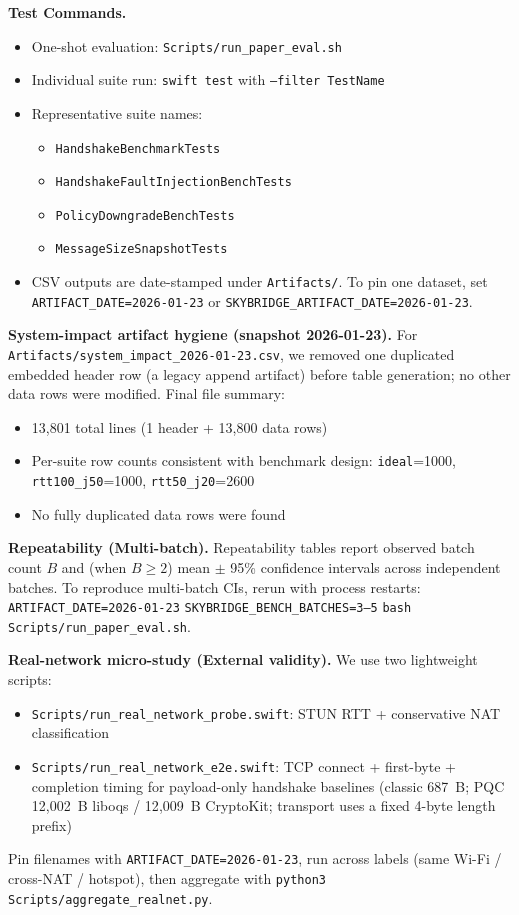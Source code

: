 \documentclass[10pt,journal,compsoc]{IEEEtran}
\providecommand{\tightlist}{%
	  \setlength{\itemsep}{0pt}\setlength{\parskip}{0pt}}
\begin{document}
\textbf{Test Commands.}
\begin{itemize}\tightlist
\item One-shot evaluation:
\texttt{Scripts/\allowbreak run\_\allowbreak paper\_\allowbreak eval.sh}
\item Individual suite run:
\texttt{swift test} with \texttt{--filter TestName}
\item Representative suite names:
\begin{itemize}\tightlist
\item \texttt{HandshakeBenchmarkTests}
\item \texttt{HandshakeFaultInjectionBenchTests}
\item \texttt{PolicyDowngradeBenchTests}
\item \texttt{MessageSizeSnapshotTests}
\end{itemize}
\item CSV outputs are date-stamped under \texttt{Artifacts/}. To pin one
dataset, set
\texttt{ARTIFACT\_DATE=2026-01-23} or
\texttt{SKYBRIDGE\_ARTIFACT\_DATE=2026-01-23}.
\end{itemize}

\textbf{System-impact artifact hygiene (snapshot 2026-01-23).}
For \texttt{Artifacts/system\_impact\_2026-01-23.csv}, we removed one duplicated
embedded header row (a legacy append artifact) before table generation; no
other data rows were modified. Final file summary:
\begin{itemize}\tightlist
\item 13{,}801 total lines (1 header + 13{,}800 data rows)
\item Per-suite row counts consistent with benchmark design:
\texttt{ideal}=1000, \texttt{rtt100\_j50}=1000,
\texttt{rtt50\_j20}=2600
\item No fully duplicated data rows were found
\end{itemize}

\textbf{Repeatability (Multi-batch).}
Repeatability tables report observed batch count $B$ and
(when $B \ge 2$) mean $\pm$ 95\% confidence intervals across independent
batches. To reproduce multi-batch CIs, rerun with process restarts:
\texttt{ARTIFACT\_DATE=2026-01-23}
\texttt{SKYBRIDGE\_BENCH\_BATCHES=3--5}
\texttt{bash Scripts/\allowbreak run\_\allowbreak paper\_\allowbreak eval.sh}.

\textbf{Real-network micro-study (External validity).}
We use two lightweight scripts:
\begin{itemize}\tightlist
\item \texttt{Scripts/\allowbreak run\_\allowbreak real\_\allowbreak network\_\allowbreak probe.swift}:
STUN RTT + conservative NAT classification
\item \texttt{Scripts/\allowbreak run\_\allowbreak real\_\allowbreak network\_\allowbreak e2e.swift}:
TCP connect + first-byte + completion timing for payload-only handshake
baselines (classic 687~B; PQC 12{,}002~B liboqs / 12{,}009~B CryptoKit; transport uses a fixed 4-byte length prefix)
\end{itemize}
Pin filenames with \texttt{ARTIFACT\_DATE=2026-01-23}, run across labels
(same Wi-Fi / cross-NAT / hotspot), then aggregate with
\texttt{python3 Scripts/\allowbreak aggregate\_\allowbreak realnet.py}.
\end{document}
